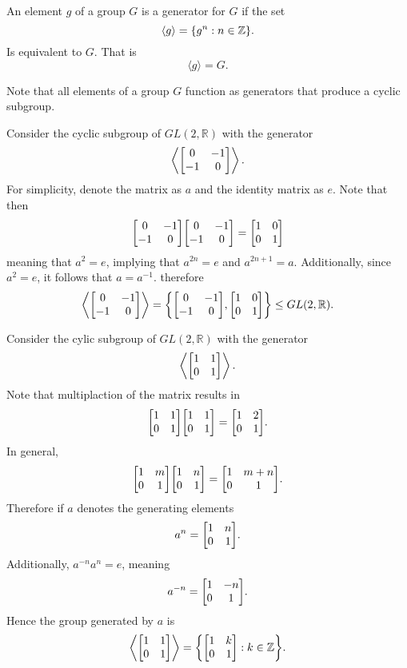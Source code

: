 \documentclass[../notes.tex]{subfiles}
\begin{document}
\begin{definition}[Generator]
	An element $g$ of a group $G$ is a generator for $G$ if the set
	\[
		\langle g \rangle = \qty{g^n : n \in \mathbb{Z}}
	.\]
	Is equivalent to $G$. That is
	\[
		\langle g \rangle = G
	.\]
\end{definition}

Note that all elements of a group $G$ function as generators that produce a cyclic subgroup.

\begin{example}
	Consider the cyclic subgroup of $GL(2,\mathbb{R})$ with the generator
	\[
		\left\langle \mqty[0 & -1 \\ -1 & 0] \right\rangle
	.\]
	For simplicity, denote the matrix as $a$ and the identity matrix as $e$. Note that then
	\[
		\mqty[0 & -1 \\ -1 & 0] \mqty[0 & -1 \\ -1 & 0] = \mqty[1 & 0 \\ 0 & 1]
	\]
	meaning that $a^2 = e$, implying that $a^{2n} = e$ and $a^{2n+1} = a$. Additionally, since $a^2 = e$, it follows that $a = a^{-1}$. therefore
	\[
		\left\langle \mqty[0 & -1 \\ -1 & 0] \right\rangle = \qty{\mqty[0 & -1 \\ -1 & 0], \mqty[1 & 0 \\ 0 & 1]} \leq GL(2, \mathbb{R})
	.\]
\end{example}

\begin{example}
	Consider the cylic subgroup of $GL(2,\mathbb{R})$ with the generator
	\[
		\left\langle \mqty[1 & 1 \\ 0 & 1] \right\rangle
	.\]
	Note that multiplaction of the matrix results in
	\[
		\mqty[1 & 1 \\ 0 & 1] \mqty[1 & 1 \\ 0 & 1] = \mqty[1 & 2 \\ 0 & 1]
	.\]
	In general,
	\[
		\mqty[1 & m \\ 0 & 1] \mqty[1 & n \\ 0 & 1 ] = \mqty[1 & m + n \\ 0 & 1]
	.\]
	Therefore if $a$ denotes the generating elements
	\[
		a^n = \mqty[1 & n \\ 0 & 1]
	.\]
	Additionally, $a^{-n} a^n = e$, meaning
	\[
		a^{-n} = \mqty[1 & -n \\ 0 & 1]
	.\]
	Hence the group generated by $a$ is
	\[
		\left\langle \mqty[1 & 1 \\ 0 & 1] \right\rangle = \qty{\mqty[1 & k \\ 0 & 1] : k \in \mathbb{Z}}
	.\]
\end{example}
\end{document}
